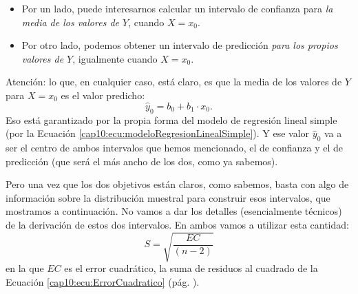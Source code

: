 \begin{itemize}
  \item Por un lado, puede interesarnos calcular un intervalo de confianza para {\em la media de los valores de $Y$}, cuando $X=x_0$.
  \item Por otro lado, podemos obtener un intervalo de predicción {\em para los propios valores de $Y$}, igualmente cuando $X=x_0$.
\end{itemize}
Atención: lo que, en cualquier caso, está claro, es que la media de los valores de $Y$ para $X=x_0$ es el valor predicho:
\[\hat y_0=b_0+b_1\cdot x_0.\]
Eso está garantizado por la propia forma del modelo de regresión lineal simple (por la Ecuación \ref{cap10:ecu:modeloRegresionLinealSimple}). Y ese valor $\hat y_0$ va a ser el centro de ambos intervalos que hemos mencionado, el de confianza y el de predicción (que será el más ancho de los dos, como ya sabemos).

Pero una vez que los dos objetivos están claros, como sabemos, basta con algo de información sobre la distribución muestral para construir esos intervalos, que mostramos a continuación. No vamos a dar los detalles (esencialmente técnicos) de la derivación de estos dos intervalos. En ambos vamos a utilizar esta cantidad:
\begin{equation}\label{cap10:ecu:FragmentoIntervalosConfianzaPredciccion}
    S=\sqrt{\dfrac{EC}{(n-2)}}
\end{equation}
en la que $EC$ es el error cuadrático, la suma de residuos al cuadrado de la Ecuación \ref{cap10:ecu:ErrorCuadratico} (pág. \pageref{cap10:ecu:ErrorCuadratico}).

    \begin{center}
    \end{center}

